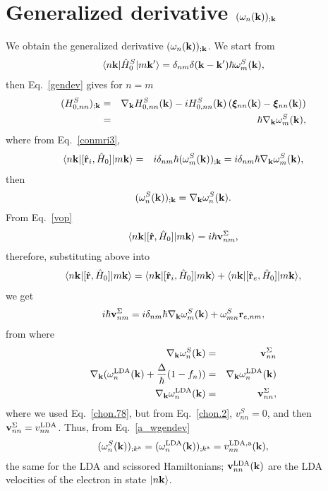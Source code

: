 \section{Generalized derivative $(\omega_n(\mathbf{k}))_{;\mathbf{k}}$}\label{gwk}

We obtain the
generalized derivative $(\omega_n(\mathbf{k}))_{;\mathbf{k}}$.
We start from
\begin{eqnarray}\label{a_conH0}
\langle n\mathbf{k} |\hat{H}^S_0| m\mathbf{k}' \rangle=\delta_{nm}\delta(\mathbf{k}-\mathbf{k}')\hbar\omega^S_m(\mathbf{k})
,
\end{eqnarray}
then Eq.~\eqref{gendev} gives for $n=m$
\begin{eqnarray}\label{a_genderH0}
(H^S_{0,nn})_{;\mathbf{k}}&=&
\nabla_{\mathbf{k}}
H^S_{0,n n}(\mathbf{k})
-
i
H^S_{0,nn}(\mathbf{k})
\left(
\boldsymbol{\xi}_{nn}(\mathbf{k})
-
\boldsymbol{\xi}_{nn}(\mathbf{k})
\right)
\nonumber\\
&=&
\hbar\nabla_{\mathbf{k}}\omega^S_m(\mathbf{k})
,
\end{eqnarray}
where from Eq.~\eqref{conmri3}, 
\begin{eqnarray}\label{a_rih0}
\langle n\mathbf{k} |[\hat{\mathbf{r}}_i,\hat{H}_0]| m\mathbf{k} \rangle&=&
i\delta_{nm}\hbar(\omega^S_m(\mathbf{k}))_{;\mathbf{k}}
=
i\delta_{nm}\hbar\nabla_{\mathbf{k}}\omega^S_m(\mathbf{k})
,
\end{eqnarray}
then
\begin{eqnarray}\label{a_wgendev}
(\omega^S_n(\mathbf{k}))_{;\mathbf{k}}=
\nabla_{\mathbf{k}}\omega^S_n(\mathbf{k})
.
\end{eqnarray}
From Eq.~\eqref{vop} 
\begin{eqnarray}\label{a_hr}
\langle n\mathbf{k} |[\hat{\mathbf{r}},\hat{H}_0]| m\mathbf{k} \rangle=
i\hbar\mathbf{v}^\Sigma_{nm}
,
\end{eqnarray}
therefore, substituting above into
\begin{eqnarray}\label{a_hrt}
\langle n\mathbf{k} |[\hat{\mathbf{r}},\hat{H}_0]| m\mathbf{k} \rangle=
\langle n\mathbf{k} |[\hat{\mathbf{r}}_i,\hat{H}_0]| m\mathbf{k} \rangle
+
\langle n\mathbf{k} |[\hat{\mathbf{r}}_e,\hat{H}_0]| m\mathbf{k} \rangle
,
\end{eqnarray}
we get
\begin{eqnarray}\label{a_hrt2}
i\hbar\mathbf{v}^\Sigma_{nm}=
i\delta_{nm}\hbar\nabla_{\mathbf{k}}\omega^S_m(\mathbf{k})
+
\omega^S_{mn}\mathbf{r}_{e,nm}
,
\end{eqnarray}
from where
\begin{eqnarray}\label{a_gradw}
\nabla_{\mathbf{k}}\omega^S_n(\mathbf{k})
&=&
\mathbf{v}^\Sigma_{nn}
\nonumber\\
\nabla_{\mathbf{k}}(\omega^{\mathrm{LDA}}_n(\mathbf{k})+\frac{\Delta}{\hbar}(1-f_n))
&=&
\nabla_{\mathbf{k}}\omega^{\mathrm{LDA}}_n(\mathbf{k})
\nonumber\\
\nabla_{\mathbf{k}}\omega^{\mathrm{LDA}}_n(\mathbf{k})
&=&
\mathbf{v}^\Sigma_{nn}
,
\end{eqnarray}
where we used Eq.~\eqref{chon.78},
but from 
Eq.~\eqref{chon.2}, $v^S_{nn}=0$, and then
$\mathbf{v}^\Sigma_{nn}=v^{\mathrm{LDA}}_{nn}$.
Thus,  from Eq.~\eqref{a_wgendev}
\begin{eqnarray}\label{a_gradw2}
(\omega^S_n(\mathbf{k}))_{;k^{\mathrm{a}}}=
(\omega^{\mathrm{LDA}}_n(\mathbf{k}))_{;k^{\mathrm{a}}}=
v^{\mathrm{LDA},\mathrm{a}}_{nn}(\mathbf{k})
,
\end{eqnarray}
the same for the LDA and scissored Hamiltonians; $\mathbf{v}_{nn}^{\mathrm{LDA}}(\mathbf{k})$ are
the LDA velocities of the electron in state $| n\mathbf{k} \rangle$.
